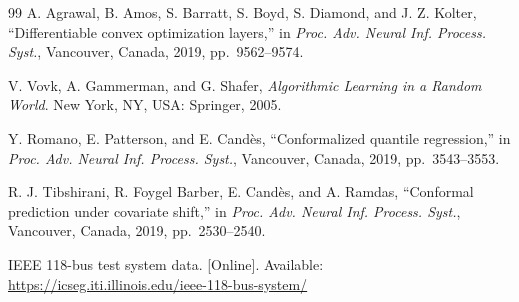 \documentclass[lettersize,journal]{IEEEtran}
\theoremstyle{definition}
\begin{document}
\begin{thebibliography}{99}
A. Agrawal, B. Amos, S. Barratt, S. Boyd, S. Diamond, and J. Z. Kolter, ``Differentiable convex optimization layers,'' in \emph{Proc. Adv. Neural Inf. Process. Syst.}, Vancouver, Canada, 2019, pp.~9562--9574.

V. Vovk, A. Gammerman, and G. Shafer, \emph{Algorithmic Learning in a Random World}. New York, NY, USA: Springer, 2005.

Y. Romano, E. Patterson, and E. Cand\`{e}s, ``Conformalized quantile regression,'' in \emph{Proc. Adv. Neural Inf. Process. Syst.}, Vancouver, Canada, 2019, pp.~3543--3553.

R. J. Tibshirani, R. Foygel Barber, E. Cand\`{e}s, and A. Ramdas, ``Conformal prediction under covariate shift,'' in \emph{Proc. Adv. Neural Inf. Process. Syst.}, Vancouver, Canada, 2019, pp.~2530--2540.

IEEE 118-bus test system data. [Online]. Available: \url{https://icseg.iti.illinois.edu/ieee-118-bus-system/}

\end{thebibliography}
\end{document}
